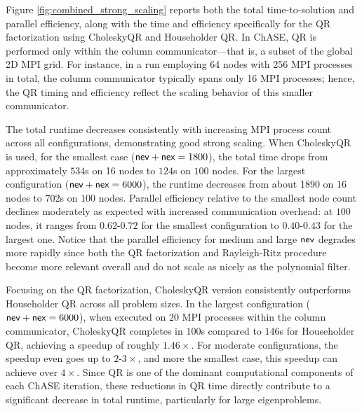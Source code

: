 Figure \ref{fig:combined_strong_scaling} reports both the total time-to-solution and parallel efficiency, along with the time and efficiency specifically for the QR factorization using CholeskyQR and Householder QR.
In ChASE, QR is performed only within the column communicator—that is, a subset of the global 2D MPI grid. For instance, in a run employing 64 nodes with 256 MPI processes in total, the column communicator typically spans only 16 MPI processes; hence, the QR timing and efficiency reflect the scaling behavior of this smaller communicator.




The total runtime decreases consistently with increasing MPI process count across all configurations, demonstrating good strong scaling. When CholeskyQR is used, for the smallest case ($\textsf{nev}+\textsf{nex}=1800$), the total time drops from approximately $534$s on 16 nodes to $124$s on $100$ nodes. For the largest configuration ($\textsf{nev}+\textsf{nex}=6000$), the runtime decreases from about 1890 on $16$ nodes to $702$s on $100$ nodes.
Parallel efficiency relative to the smallest node count declines moderately as expected with increased communication overhead: at $100$ nodes, it ranges from $0.62$-$0.72$ for the smallest configuration to $0.40$-$0.43$ for the largest one. Notice that the parallel efficiency for medium and large $\textsf{nev}$ degrades more rapidly since both the QR factorization and Rayleigh-Ritz procedure become more relevant overall and do not scale as nicely as the polynomial filter. 

Focusing on the QR factorization, CholeskyQR version consistently outperforms Householder QR across all problem sizes. In the largest configuration ($\textsf{nev}+\textsf{nex}=6000$), when executed on $20$ MPI processes within the column communicator, CholeskyQR completes in $100$s compared to $146$s for Householder QR, achieving a speedup of roughly $1.46\times$. For moderate configurations, the speedup even goes up to $2$-$3\times$, and more the smallest case, this speedup can achieve over $4\times$. Since QR is one of the dominant computational components of each ChASE iteration, these reductions in QR time directly contribute to a significant decrease in total runtime, particularly for large eigenproblems.

